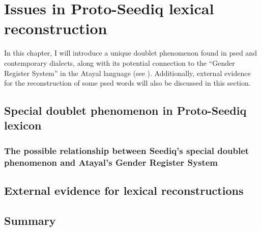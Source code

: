 \chapter{Issues in Proto-Seediq lexical reconstruction} \label{ch6}

In this chapter, I will introduce a unique doublet phenomenon found in \acl{psed} and contemporary dialects, along with its potential connection to the ``Gender Register System'' in the Atayal language (see \cite{li1980gender,li1982gender,li1983gender,goderich2020phd}). Additionally, external evidence for the reconstruction of some \acl{psed} words will also be discussed in this section.


\section{Special doublet phenomenon in Proto-Seediq lexicon} \label{sec:sepical_doublet}
\lipsum[1-15]

\subsection{The possible relationship between Seediq's special doublet phenomenon and Atayal's Gender Register System}
\lipsum[1-7]

\section{External evidence for lexical reconstructions} \label{sec:external_lexical_evidence}
\lipsum[1-7]

\section{Summary}
\lipsum[1-4]